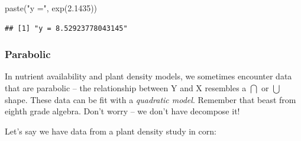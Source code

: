 \documentclass[
]{book}
\newenvironment{Shaded}{\begin{snugshade}}{\end{snugshade}}
\newcommand{\AttributeTok}[1]{\textcolor[rgb]{0.77,0.63,0.00}{#1}}
\newcommand{\DecValTok}[1]{\textcolor[rgb]{0.00,0.00,0.81}{#1}}
\newcommand{\FloatTok}[1]{\textcolor[rgb]{0.00,0.00,0.81}{#1}}
\newcommand{\FunctionTok}[1]{\textcolor[rgb]{0.00,0.00,0.00}{#1}}
\newcommand{\NormalTok}[1]{#1}
\newcommand{\OtherTok}[1]{\textcolor[rgb]{0.56,0.35,0.01}{#1}}
\newcommand{\SpecialCharTok}[1]{\textcolor[rgb]{0.00,0.00,0.00}{#1}}
\newcommand{\StringTok}[1]{\textcolor[rgb]{0.31,0.60,0.02}{#1}}
\begin{document}
\begin{Shaded}
\begin{Highlighting}[]
\FunctionTok{paste}\NormalTok{(}\StringTok{"y ="}\NormalTok{, }\FunctionTok{exp}\NormalTok{(}\FloatTok{2.1435}\NormalTok{))}
\end{Highlighting}
\end{Shaded}

\begin{verbatim}
## [1] "y = 8.52923778043145"
\end{verbatim}

\hypertarget{parabolic}{%
\subsubsection{Parabolic}\label{parabolic}}

In nutrient availability and plant density models, we sometimes encounter data that are parabolic -- the relationship between Y and X resembles a \(\bigcap\) or \(\bigcup\) shape. These data can be fit with a \emph{quadratic model}. Remember that beast from eighth grade algebra. Don't worry -- we don't have decompose it!

Let's say we have data from a plant density study in corn:

\begin{Shaded}
\end{Shaded}
\end{document}
